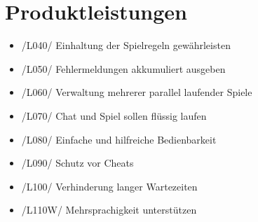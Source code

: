 \documentclass{article}
\begin{document}
\section{Produktleistungen}
\begin{itemize}
	\item /L040/ Einhaltung der Spielregeln gewährleisten
	\item /L050/ Fehlermeldungen akkumuliert ausgeben
	\item /L060/ Verwaltung mehrerer parallel laufender Spiele
	\item /L070/ Chat und Spiel sollen flüssig laufen
	\item /L080/ Einfache und hilfreiche Bedienbarkeit
	\item /L090/ Schutz vor Cheats
	\item /L100/ Verhinderung langer Wartezeiten
	\item /L110W/ Mehrsprachigkeit unterstützen
\end{itemize}
\end{document}
